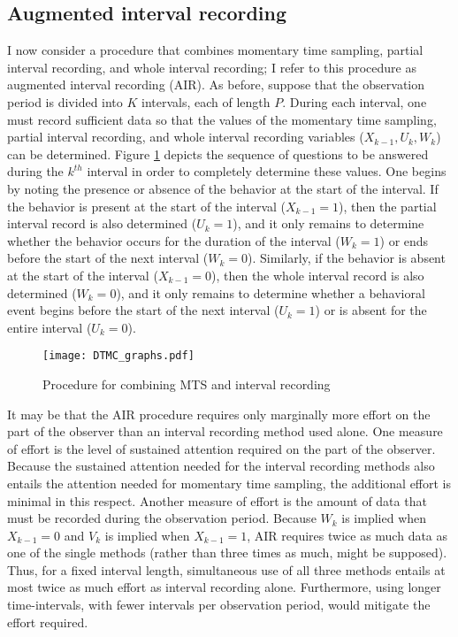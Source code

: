 \documentclass[11pt]{article}
\begin{document}
\subsection{Augmented interval recording}
\label{sec:AIR}

I now consider a procedure that combines momentary time sampling, partial interval recording, and whole interval recording; I refer to this procedure as augmented interval recording (AIR). As before, suppose that the observation period is divided into $K$ intervals, each of length $P$. During each interval, one must record sufficient data so that the values of the momentary time sampling, partial interval recording, and whole interval recording variables ($X_{k-1},U_k,W_k$) can be determined. Figure \ref{fig:questions} depicts the sequence of questions to be answered during the $k^{th}$ interval in order to completely determine these values. One begins by noting the presence or absence of the behavior at the start of the interval. If the behavior is present at the start of the interval ($X_{k-1} = 1$), then the partial interval record is also determined ($U_k = 1$), and it only remains to determine whether the behavior occurs for the duration of the interval ($W_k = 1$) or ends before the start of the next interval ($W_k = 0$). Similarly, if the behavior is absent at the start of the interval ($X_{k-1} = 0$), then the whole interval record is also determined ($W_k = 0$), and it only remains to determine whether a behavioral event begins before the start of the next interval ($U_k = 1$) or is absent for the entire interval ($U_k = 0$).

\begin{figure}[hbtp]
\centering
\texttt{[image: DTMC\_graphs.pdf]}
\caption{Procedure for combining MTS and interval recording}
\label{fig:questions}
\end{figure}	 

It may be that the AIR procedure requires only marginally more effort on the part of the observer than an interval recording method used alone. One measure of effort is the level of sustained attention required on the part of the observer. Because the sustained attention needed for the interval recording methods also entails the attention needed for momentary time sampling, the additional effort is minimal in this respect. Another measure of effort is the amount of data that must be recorded during the observation period. Because $W_k$ is implied when $X_{k-1} = 0$ and $V_k$ is implied when $X_{k-1} = 1$, AIR requires twice as much data as one of the single methods (rather than three times as much, might be supposed). Thus, for a fixed interval length, simultaneous use of all three methods entails at most twice as much effort as interval recording alone. Furthermore, using longer time-intervals, with fewer intervals per observation period, would mitigate the effort required.
\end{document}
